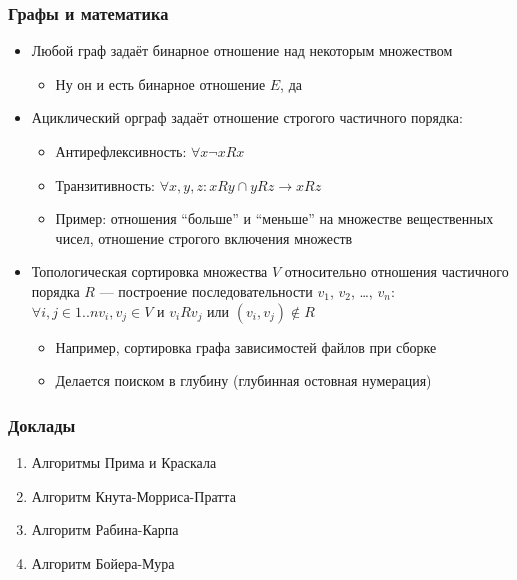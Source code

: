 \documentclass[xetex,mathserif,serif]{beamer}
\begin{document}
	\begin{frame}
		\frametitle{Графы и математика}
		\begin{itemize}
			\item Любой граф задаёт бинарное отношение над некоторым множеством
			\begin{itemize}
				\item Ну он и есть бинарное отношение $E$, да
			\end{itemize}
			\item Ациклический орграф задаёт отношение строгого частичного порядка:
			\begin{itemize}
				\item Антирефлексивность: $\forall x \neg xRx$
				\item Транзитивность: $\forall x,y,z: xRy \cap yRz \rightarrow xRz$
				\item Пример: отношения ``больше'' и ``меньше'' на множестве вещественных чисел, отношение строгого включения множеств
			\end{itemize}
			\item Топологическая сортировка множества $V$ относительно отношения частичного порядка $R$ --- построение последовательности $v_1$, $v_2$, …, $v_n$: 
			$\forall i,j \in 1..n v_i, v_j \in V$ и $v_iRv_j$ или $(v_i, v_j) \not\in R$
			\begin{itemize}
				\item Например, сортировка графа зависимостей файлов при сборке
				\item Делается поиском в глубину (глубинная остовная нумерация)
			\end{itemize}
		\end{itemize}
	\end{frame}

	\begin{frame}
		\frametitle{Доклады}
		\begin{enumerate}
			\item Алгоритмы Прима и Краскала
			\item Алгоритм Кнута-Морриса-Пратта
			\item Алгоритм Рабина-Карпа
			\item Алгоритм Бойера-Мура
		\end{enumerate}
	\end{frame}
\end{document}
